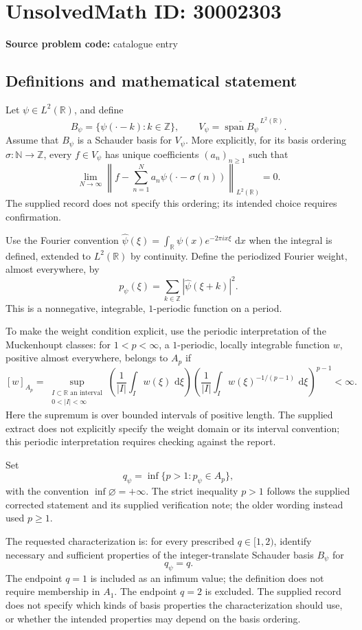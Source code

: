 \documentclass[11pt]{article}
\newcommand{\N}{\mathbb{N}}
\newcommand{\Z}{\mathbb{Z}}
\newcommand{\R}{\mathbb{R}}
\newcommand{\dd}{\,\mathrm{d}}
\begin{document}
\section*{UnsolvedMath ID: 30002303}
\textbf{Source problem code:} catalogue entry
\subsection{Definitions and mathematical statement}
Let \(\psi\in L^2(\R)\), and define
\[
B_\psi=\{\psi(\cdot-k):k\in\Z\},\qquad V_\psi=\overline{\operatorname{span}B_\psi}^{\,L^2(\R)}.
\]
Assume that \(B_\psi\) is a Schauder basis for \(V_\psi\). More explicitly, for its basis ordering \(\sigma:\N\to\Z\), every \(f\in V_\psi\) has unique coefficients \((a_n)_{n\geq1}\) such that
\[
\lim_{N\to\infty}\left\|f-\sum_{n=1}^{N}a_n\psi(\cdot-\sigma(n))\right\|_{L^2(\R)}=0.
\]
The supplied record does not specify this ordering; its intended choice requires confirmation.

Use the Fourier convention \(\widehat\psi(\xi)=\int_{\R}\psi(x)e^{-2\pi i x\xi}\,\dd x\) when the integral is defined, extended to \(L^2(\R)\) by continuity. Define the periodized Fourier weight, almost everywhere, by
\[
p_\psi(\xi)=\sum_{k\in\Z}|\widehat\psi(\xi+k)|^2.
\]
This is a nonnegative, integrable, \(1\)-periodic function on a period.

To make the weight condition explicit, use the periodic interpretation of the Muckenhoupt classes: for \(1<p<\infty\), a \(1\)-periodic, locally integrable function \(w\), positive almost everywhere, belongs to \(A_p\) if
\[
[w]_{A_p}=\sup_{\substack{I\subset\R\text{ an interval}\\0<|I|<\infty}}
\left(\frac{1}{|I|}\int_I w(\xi)\,\dd\xi\right)
\left(\frac{1}{|I|}\int_I w(\xi)^{-1/(p-1)}\,\dd\xi\right)^{p-1}<\infty.
\]
Here the supremum is over bounded intervals of positive length. The supplied extract does not explicitly specify the weight domain or its interval convention; this periodic interpretation requires checking against the report.

Set
\[
q_\psi=\inf\{p>1:p_\psi\in A_p\},
\]
with the convention \(\inf\varnothing=+\infty\). The strict inequality \(p>1\) follows the supplied corrected statement and its supplied verification note; the older wording instead used \(p\geq1\).

The requested characterization is: for every prescribed \(q\in[1,2)\), identify necessary and sufficient properties of the integer-translate Schauder basis \(B_\psi\) for
\[
q_\psi=q.
\]
The endpoint \(q=1\) is included as an infimum value; the definition does not require membership in \(A_1\). The endpoint \(q=2\) is excluded. The supplied record does not specify which kinds of basis properties the characterization should use, or whether the intended properties may depend on the basis ordering.
\end{document}
